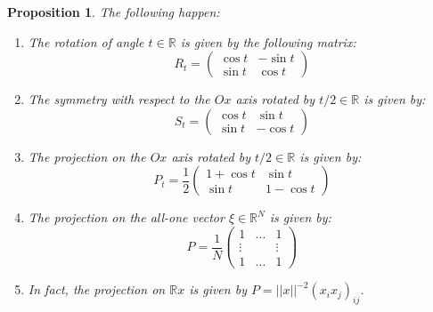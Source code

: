 \documentclass[12pt]{amsbook}
\newtheorem{proposition}[theorem]{Proposition}
\begin{document}

\begin{proposition}
The following happen:
\begin{enumerate}
\item The rotation of angle $t\in\mathbb R$ is given by the following matrix:
$$R_t=\begin{pmatrix}\cos t&-\sin t\\ \sin t&\cos t\end{pmatrix}$$

\item The symmetry with respect to the $Ox$ axis rotated by $t/2\in\mathbb R$ is given by:
$$S_t=\begin{pmatrix}\cos t&\sin t\\ \sin t&-\cos t\end{pmatrix}$$

\item The projection on the $Ox$ axis rotated by $t/2\in\mathbb R$ is given by:
$$P_t=\frac{1}{2}\begin{pmatrix}1+\cos t&\sin t\\ \sin t&1-\cos t\end{pmatrix}$$

\item The projection on the all-one vector $\xi\in\mathbb R^N$ is given by:
$$P=\frac{1}{N}
\begin{pmatrix}
1&\ldots&1\\
\vdots&&\vdots\\
1&\ldots&1
\end{pmatrix}$$

\item In fact, the projection on $\mathbb Rx$ is given by $P=||x||^{-2}(x_ix_j)_{ij}$.
\end{enumerate}
\end{proposition}
\end{document}
